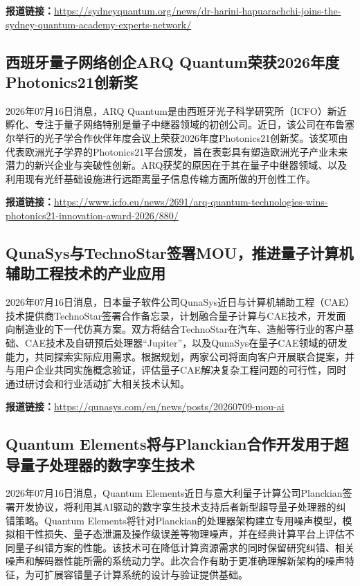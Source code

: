 \documentclass[12pt,a4paper]{ctexart}
\begin{document}
\noindent\textbf{报道链接：}\url{https://sydneyquantum.org/news/dr-harini-hapuarachchi-joins-the-sydney-quantum-academy-experts-network/}

\subsection{ 西班牙量子网络创企ARQ Quantum荣获2026年度Photonics21创新奖 }

2026年07月16日消息，ARQ Quantum是由西班牙光子科学研究所（ICFO）新近孵化、专注于量子网络特别是量子中继器领域的初创公司。近日，该公司在布鲁塞尔举行的光子学合作伙伴年度会议上荣获2026年度Photonics21创新奖。该奖项由代表欧洲光子学界的Photonics21平台颁发，旨在表彰具有塑造欧洲光子产业未来潜力的新兴企业与突破性创新。ARQ获奖的原因在于其在量子中继器领域、以及利用现有光纤基础设施进行远距离量子信息传输方面所做的开创性工作。

\noindent\textbf{报道链接：}\url{https://www.icfo.eu/news/2691/arq-quantum-technologies-wins-photonics21-innovation-award-2026/880/}

\subsection{ QunaSys与TechnoStar签署MOU，推进量子计算机辅助工程技术的产业应用 }

2026年07月16日消息，日本量子软件公司QunaSys近日与计算机辅助工程（CAE）技术提供商TechnoStar签署合作备忘录，计划融合量子计算与CAE技术，开发面向制造业的下一代仿真方案。双方将结合TechnoStar在汽车、造船等行业的客户基础、CAE技术及自研预后处理器“Jupiter”，以及QunaSys在量子CAE领域的研发能力，共同探索实际应用需求。根据规划，两家公司将面向客户开展联合提案，并与用户企业共同实施概念验证，评估量子CAE解决复杂工程问题的可行性，同时通过研讨会和行业活动扩大相关技术认知。

\noindent\textbf{报道链接：}\url{https://qunasys.com/en/news/posts/20260709-mou-ai}

\subsection{ Quantum Elements将与Planckian合作开发用于超导量子处理器的数字孪生技术 }

2026年07月16日消息，Quantum Elements近日与意大利量子计算公司Planckian签署开发协议，将利用其AI驱动的数字孪生技术支持后者新型超导量子处理器的纠错策略。Quantum Elements将针对Planckian的处理器架构建立专用噪声模型，模拟相干性损失、量子态泄漏及操作级误差等物理噪声，并在经典计算平台上评估不同量子纠错方案的性能。该技术可在降低计算资源需求的同时保留研究纠错、相关噪声和解码器性能所需的系统动力学。此次合作有助于更准确理解新架构的噪声特征，为可扩展容错量子计算系统的设计与验证提供基础。
\end{document}
